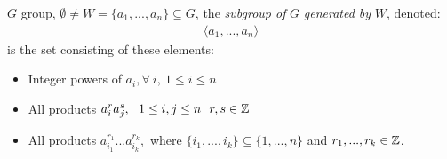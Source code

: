 \begin{definition}
$G$ group, $\emptyset\neq W=\{a_1,...,a_n\}\subseteq G$, the \textit{subgroup of} $G$
\textit{generated by} $W$, denoted:
\begin{align}
    \langle a_1,...,a_n \rangle \nonumber
\end{align}
is the set consisting of these elements:
\begin{itemize}
    \item Integer powers of $a_i, \forall \ i, \ 1\leq i \leq n$
    \item All products $a_i^r a_j^s, \ \ 1\leq i,j \leq n \ \ r,s\in {\mathbb{Z}}$
    \item All products $a_{i_1}^{r_1} ... a_{i_k}^{r_k}, $ where
    $\{i_1,...,i_k\}\subseteq \{1,...,n\}$ and $r_1,...,r_k\in {\mathbb{Z}}$.
\end{itemize}

\end{definition}
%
